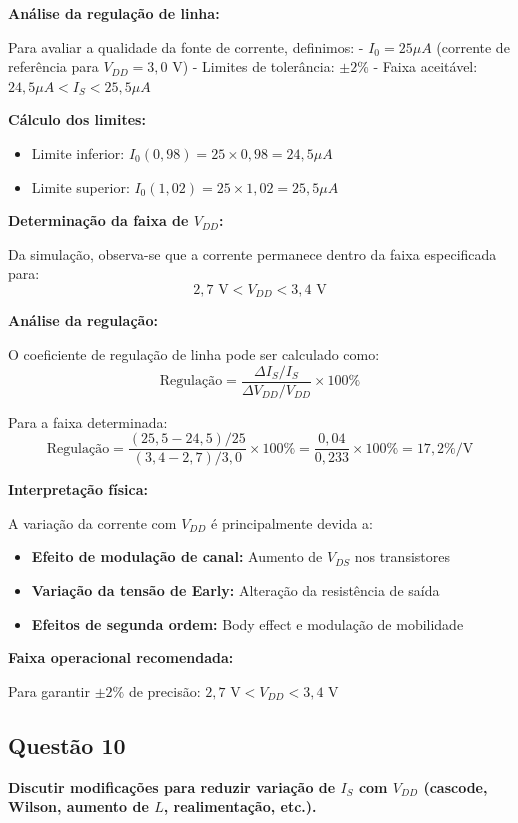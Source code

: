 ﻿\documentclass[12pt,a4paper]{article}
\begin{document}
\textbf{Análise da regulação de linha:}

Para avaliar a qualidade da fonte de corrente, definimos:
- $I_0 = 25 \mu A$ (corrente de referência para $V_{DD} = 3,0$ V)
- Limites de tolerância: $\pm 2\%$
- Faixa aceitável: $24,5 \mu A < I_S < 25,5 \mu A$

\textbf{Cálculo dos limites:}
\begin{itemize}
    \item Limite inferior: $I_0(0,98) = 25 \times 0,98 = 24,5 \mu A$
    \item Limite superior: $I_0(1,02) = 25 \times 1,02 = 25,5 \mu A$
\end{itemize}

\textbf{Determinação da faixa de $V_{DD}$:}

Da simulação, observa-se que a corrente permanece dentro da faixa especificada para:
$$2,7 \text{ V} < V_{DD} < 3,4 \text{ V}$$

\textbf{Análise da regulação:}

O coeficiente de regulação de linha pode ser calculado como:
$$\text{Regulação} = \frac{\Delta I_S / I_S}{\Delta V_{DD} / V_{DD}} \times 100\% $$

Para a faixa determinada:
$$\text{Regulação} = \frac{(25,5-24,5)/25}{(3,4-2,7)/3,0} \times 100\% = \frac{0,04}{0,233} \times 100\% = 17,2\%/\text{V}$$

\textbf{Interpretação física:}

A variação da corrente com $V_{DD}$ é principalmente devida a:
\begin{itemize}
    \item \textbf{Efeito de modulação de canal:} Aumento de $V_{DS}$ nos transistores
    \item \textbf{Variação da tensão de Early:} Alteração da resistência de saída
    \item \textbf{Efeitos de segunda ordem:} Body effect e modulação de mobilidade
\end{itemize}

\textbf{Faixa operacional recomendada:}

Para garantir $\pm 2\%$ de precisão: $\boxed{2,7 \text{ V} < V_{DD} < 3,4 \text{ V}}$

\subsection*{Questão 10}
	\textbf{Discutir modificações para reduzir variação de $I_S$ com $V_{DD}$ (cascode, Wilson, aumento de $L$, realimentação, etc.).}
\end{document}
